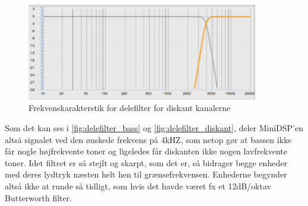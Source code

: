 \begin{figure}[H]
	\center
	\includegraphics[width=0.9\textwidth]{figur/delefilter_diskant}
	\caption{Frekvenskarakterstik for delefilter for diskant kanalerne }
	\label{fig:delefilter_diskant}
\end{figure}

Som det kan ses i \autoref{fig:delefilter_bass} og  \autoref{fig:delefilter_diskant}, deler MiniDSP'en altså signalet ved den ønskede frekvens på 4kHZ, som netop gør at bassen ikke får nogle højfrekvente toner og ligeledes får diskanten ikke nogen lavfrekvente toner. Idet filtret er så stejlt og skarpt, som det er, så bidrager begge enheder med deres lydtryk næsten helt hen til grænsefrekvensen. Enhederne begynder altså ikke at runde så tidligt, som hvis det havde været fx et 12dB/oktav Butterworth filter.
 

